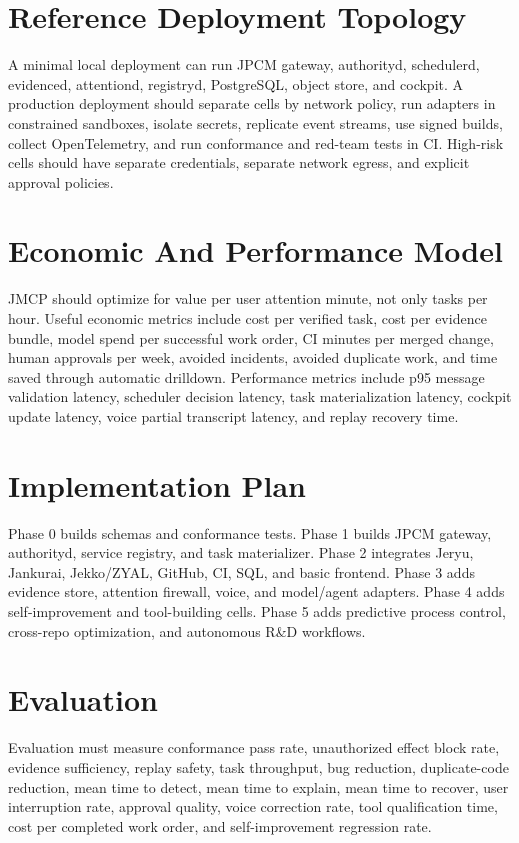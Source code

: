 \documentclass[10pt,journal,onecolumn]{IEEEtran}
\begin{document}
\section{Reference Deployment Topology}
A minimal local deployment can run JPCM gateway, authorityd, schedulerd, evidenced, attentiond, registryd, PostgreSQL, object store, and cockpit. A production deployment should separate cells by network policy, run adapters in constrained sandboxes, isolate secrets, replicate event streams, use signed builds, collect OpenTelemetry, and run conformance and red-team tests in CI. High-risk cells should have separate credentials, separate network egress, and explicit approval policies.

\section{Economic And Performance Model}
JMCP should optimize for value per user attention minute, not only tasks per hour. Useful economic metrics include cost per verified task, cost per evidence bundle, model spend per successful work order, CI minutes per merged change, human approvals per week, avoided incidents, avoided duplicate work, and time saved through automatic drilldown. Performance metrics include p95 message validation latency, scheduler decision latency, task materialization latency, cockpit update latency, voice partial transcript latency, and replay recovery time.


\section{Implementation Plan}
Phase 0 builds schemas and conformance tests. Phase 1 builds JPCM gateway, authorityd, service registry, and task materializer. Phase 2 integrates Jeryu, Jankurai, Jekko/ZYAL, GitHub, CI, SQL, and basic frontend. Phase 3 adds evidence store, attention firewall, voice, and model/agent adapters. Phase 4 adds self-improvement and tool-building cells. Phase 5 adds predictive process control, cross-repo optimization, and autonomous R\&D workflows.

\section{Evaluation}
Evaluation must measure conformance pass rate, unauthorized effect block rate, evidence sufficiency, replay safety, task throughput, bug reduction, duplicate-code reduction, mean time to detect, mean time to explain, mean time to recover, user interruption rate, approval quality, voice correction rate, tool qualification time, cost per completed work order, and self-improvement regression rate.
\end{document}
